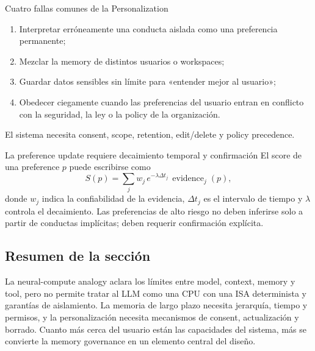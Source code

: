 


\begin{warningbox}{Cuatro fallas comunes de la Personalization}
\begin{enumerate}
  \item Interpretar erróneamente una conducta aislada como una preferencia permanente;
  \item Mezclar la memory de distintos usuarios o workspaces;
  \item Guardar datos sensibles sin límite para «entender mejor al usuario»;
  \item Obedecer ciegamente cuando las preferencias del usuario entran en conflicto con la seguridad, la ley o la policy de la organización.
\end{enumerate}
El sistema necesita consent, scope, retention, edit/delete y policy precedence.
\end{warningbox}

\begin{importantbox}{La preference update requiere decaimiento temporal y confirmación}
El score de una preference $p$ puede escribirse como
\[
S(p)=\sum_j w_j\,e^{-\lambda\Delta t_j}\,\operatorname{evidence}_j(p),
\]
donde $w_j$ indica la confiabilidad de la evidencia, $\Delta t_j$ es el intervalo de tiempo y $\lambda$ controla el decaimiento. Las preferencias de alto riesgo no deben inferirse solo a partir de conductas implícitas; deben requerir confirmación explícita.
\end{importantbox}

\subsection{Resumen de la sección}

La neural-compute analogy aclara los límites entre model, context, memory y tool, pero no permite tratar al LLM como una CPU con una ISA determinista y garantías de aislamiento. La memoria de largo plazo necesita jerarquía, tiempo y permisos, y la personalización necesita mecanismos de consent, actualización y borrado. Cuanto más cerca del usuario están las capacidades del sistema, más se convierte la memory governance en un elemento central del diseño.

